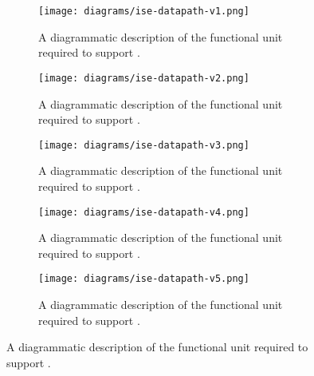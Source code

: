 
\begin{figure}[h!]
\centering
\begin{subfigure}[b]{0.45\textwidth}
\texttt{[image: diagrams/ise-datapath-v1.png]}
\caption{
  A diagrammatic description of the functional unit required to support .
}
\label{fig:v1:fu}
\end{subfigure}
\begin{subfigure}[b]{0.45\textwidth}
\texttt{[image: diagrams/ise-datapath-v2.png]}
\caption{
  A diagrammatic description of the functional unit required to support .
}
\label{fig:v2:fu}
\end{subfigure}

\begin{subfigure}[b]{0.45\textwidth}
\texttt{[image: diagrams/ise-datapath-v3.png]}
\caption{
  A diagrammatic description of the functional unit required to support .
}
\label{fig:v3:fu}
\end{subfigure}
\begin{subfigure}[b]{0.45\textwidth}
\texttt{[image: diagrams/ise-datapath-v4.png]}
\caption{
  A diagrammatic description of the functional unit required to support .
}
\label{fig:v4:fu}
\end{subfigure}

\begin{subfigure}[b]{0.45\textwidth}
\texttt{[image: diagrams/ise-datapath-v5.png]}
\caption{
  A diagrammatic description of the functional unit required to support .
}
\label{fig:v5:fu}
\end{subfigure}
\end{figure}
